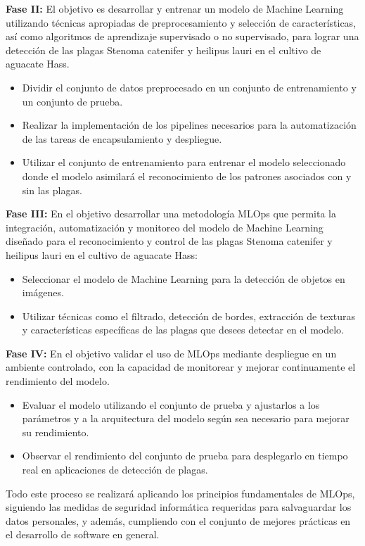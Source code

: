 \textbf{Fase II:} El objetivo es desarrollar y entrenar un modelo de Machine Learning utilizando técnicas apropiadas de preprocesamiento y selección de características, así como algoritmos de aprendizaje supervisado o no supervisado, para lograr una detección de las plagas Stenoma catenifer y heilipus lauri en el cultivo de aguacate Hass.
\begin{itemize}
    \item Dividir el conjunto de datos preprocesado en un conjunto de entrenamiento y un conjunto de prueba.
    \item Realizar la implementación de los pipelines necesarios para la automatización de las tareas de encapsulamiento y despliegue.
    \item Utilizar el conjunto de entrenamiento para entrenar el modelo seleccionado donde  el modelo asimilará el reconocimiento de los patrones asociados con y sin las plagas.
\end{itemize}

\textbf{Fase III:} En el objetivo desarrollar una metodología MLOps que permita la integración, automatización y monitoreo del modelo de Machine Learning diseñado para el reconocimiento y control de las plagas Stenoma catenifer y heilipus lauri en el cultivo de aguacate Hass:
\begin{itemize}
    \item Seleccionar el modelo de Machine Learning para la detección de objetos en imágenes.
    \item Utilizar técnicas como el filtrado, detección de bordes, extracción de texturas y características específicas de las plagas que desees detectar en el modelo.
\end{itemize}

\textbf{Fase IV:} En el objetivo validar el uso de MLOps mediante despliegue en un ambiente controlado, con la capacidad de monitorear y mejorar continuamente el rendimiento del modelo.
\begin{itemize}
    \item Evaluar el modelo utilizando el conjunto de prueba y ajustarlos a los parámetros y a la arquitectura del modelo según sea necesario para mejorar su rendimiento.
    \item Observar el rendimiento del conjunto de prueba para desplegarlo en tiempo real en aplicaciones de detección de plagas.
\end{itemize}

Todo este proceso se realizará aplicando los principios fundamentales de MLOps, siguiendo las medidas de seguridad informática requeridas para salvaguardar los datos personales, y además, cumpliendo con el conjunto de mejores prácticas en el desarrollo de software en general.
